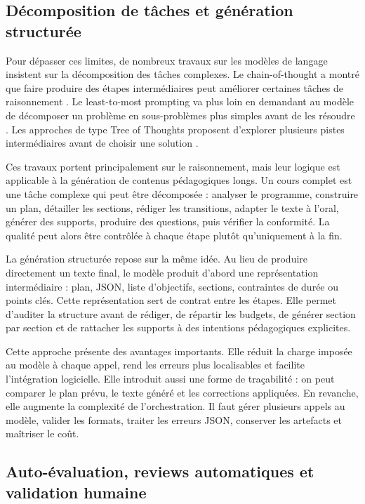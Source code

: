 \subsection{Décomposition de tâches et génération structurée}

Pour dépasser ces limites, de nombreux travaux sur les modèles de langage insistent sur
la décomposition des tâches complexes. Le chain-of-thought a montré que faire produire
des étapes intermédiaires peut améliorer certaines tâches de raisonnement
\cite{wei2022chain}. Le least-to-most prompting va plus loin en demandant au modèle de
décomposer un problème en sous-problèmes plus simples avant de les résoudre
\cite{zhou2022least}. Les approches de type Tree of Thoughts proposent d'explorer
plusieurs pistes intermédiaires avant de choisir une solution \cite{yao2023tree}.

Ces travaux portent principalement sur le raisonnement, mais leur logique est applicable
à la génération de contenus pédagogiques longs. Un cours complet est une tâche complexe
qui peut être décomposée : analyser le programme, construire un plan, détailler les
sections, rédiger les transitions, adapter le texte à l'oral, générer des supports, produire
des questions, puis vérifier la conformité. La qualité peut alors être contrôlée à chaque
étape plutôt qu'uniquement à la fin.

La génération structurée repose sur la même idée. Au lieu de produire directement un
texte final, le modèle produit d'abord une représentation intermédiaire : plan, JSON,
liste d'objectifs, sections, contraintes de durée ou points clés. Cette représentation sert
de contrat entre les étapes. Elle permet d'auditer la structure avant de rédiger, de répartir
les budgets, de générer section par section et de rattacher les supports à des intentions
pédagogiques explicites.

Cette approche présente des avantages importants. Elle réduit la charge imposée au
modèle à chaque appel, rend les erreurs plus localisables et facilite l'intégration logicielle.
Elle introduit aussi une forme de traçabilité : on peut comparer le plan prévu, le texte
généré et les corrections appliquées. En revanche, elle augmente la complexité de
l'orchestration. Il faut gérer plusieurs appels au modèle, valider les formats, traiter les
erreurs JSON, conserver les artefacts et maîtriser le coût.

\subsection{Auto-évaluation, reviews automatiques et validation humaine}

